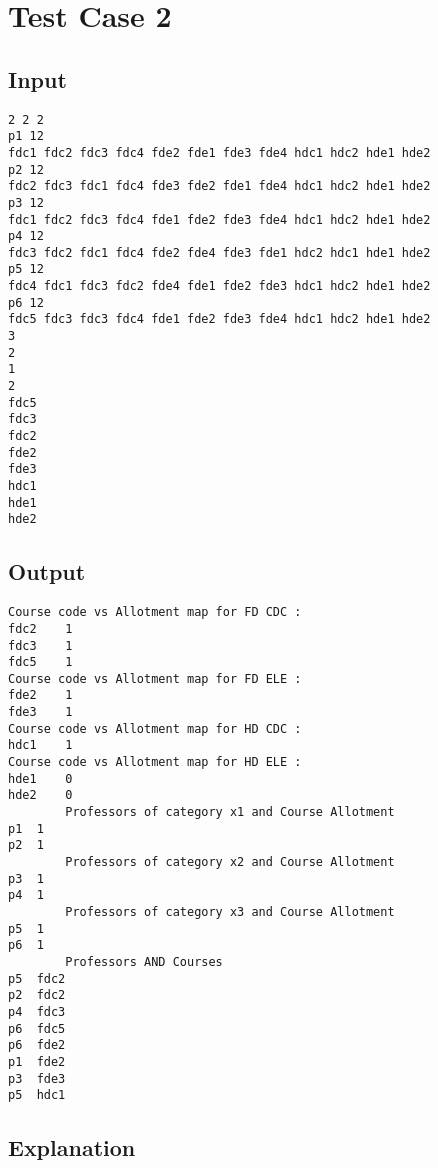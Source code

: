 \documentclass{article}
\begin{document}
\section*{Test Case 2}

\subsection*{Input}

\begin{verbatim}
2 2 2
p1 12
fdc1 fdc2 fdc3 fdc4 fde2 fde1 fde3 fde4 hdc1 hdc2 hde1 hde2
p2 12
fdc2 fdc3 fdc1 fdc4 fde3 fde2 fde1 fde4 hdc1 hdc2 hde1 hde2
p3 12
fdc1 fdc2 fdc3 fdc4 fde1 fde2 fde3 fde4 hdc1 hdc2 hde1 hde2
p4 12
fdc3 fdc2 fdc1 fdc4 fde2 fde4 fde3 fde1 hdc2 hdc1 hde1 hde2
p5 12
fdc4 fdc1 fdc3 fdc2 fde4 fde1 fde2 fde3 hdc1 hdc2 hde1 hde2
p6 12
fdc5 fdc3 fdc3 fdc4 fde1 fde2 fde3 fde4 hdc1 hdc2 hde1 hde2
3
2
1
2
fdc5
fdc3
fdc2
fde2
fde3
hdc1
hde1
hde2
\end{verbatim}

\subsection*{Output}

\begin{verbatim}
Course code vs Allotment map for FD CDC :
fdc2	1
fdc3	1
fdc5	1
Course code vs Allotment map for FD ELE :
fde2	1
fde3	1
Course code vs Allotment map for HD CDC :
hdc1	1
Course code vs Allotment map for HD ELE :
hde1	0
hde2	0
		Professors of category x1 and Course Allotment
p1	1
p2	1
		Professors of category x2 and Course Allotment
p3	1
p4	1
		Professors of category x3 and Course Allotment
p5	1
p6	1
		Professors AND Courses
p5	fdc2	
p2	fdc2	
p4	fdc3	
p6	fdc5	
p6	fde2	
p1	fde2	
p3	fde3	
p5	hdc1
\end{verbatim}

\subsection*{Explanation}
\end{document}
